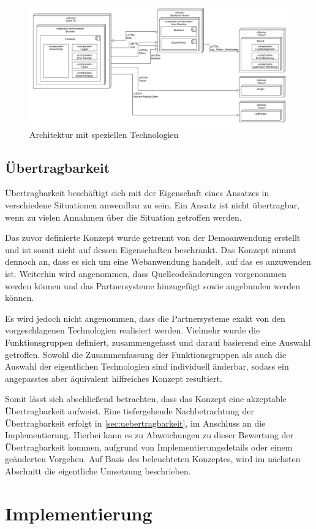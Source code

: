 \begin{figure}[H]
	\centering
	\includegraphics[width=1.00\linewidth]{img/04_erstellung-poc/konzept-technologien.png}
	\caption{Architektur mit speziellen Technologien}
	\label{fig:architektur-technologien}
\end{figure}

	\subsection{Übertragbarkeit}
	
	Übertragbarkeit beschäftigt sich mit der Eigenschaft eines Ansatzes in verschiedene Situationen anwendbar zu sein. Ein Ansatz ist nicht übertragbar, wenn zu vielen Annahmen über die Situation getroffen werden.
	
	Das zuvor definierte Konzept wurde getrennt von der Demoanwendung erstellt und ist somit nicht auf dessen Eigenschaften beschränkt. Das Konzept nimmt dennoch an, dass es sich um eine Webanwendung handelt, auf das es anzuwenden ist. Weiterhin wird angenommen, dass Quellcodeänderungen vorgenommen werden können und das Partnersysteme hinzugefügt sowie angebunden werden können.
	
	Es wird jedoch nicht angenommen, dass die Partnersysteme exakt von den vorgeschlagenen Technologien realisiert werden. Vielmehr wurde die Funktionsgruppen definiert, zusammengefasst und darauf basierend eine Auswahl getroffen. Sowohl die Zusammenfassung der Funktionsgruppen als auch die Auswahl der eigentlichen Technologien sind individuell änderbar, sodass ein angepasstes aber äquivalent hilfreiches Konzept resultiert.
	
	Somit lässt sich abschließend betrachten, dass das Konzept eine akzeptable Übertragbarkeit aufweist. Eine tiefergehende Nachbetrachtung der Übertragbarkeit erfolgt in \autoref{sec:uebertragbarkeit}, im Anschluss an die Implementierung. Hierbei kann es zu Abweichungen zu dieser Bewertung der Übertragbarkeit kommen, aufgrund von Implementierungsdetails oder einem geänderten Vorgehen. Auf Basis des beleuchteten Konzeptes, wird im nächsten Abschnitt die eigentliche Umsetzung beschrieben.

\section{Implementierung}
